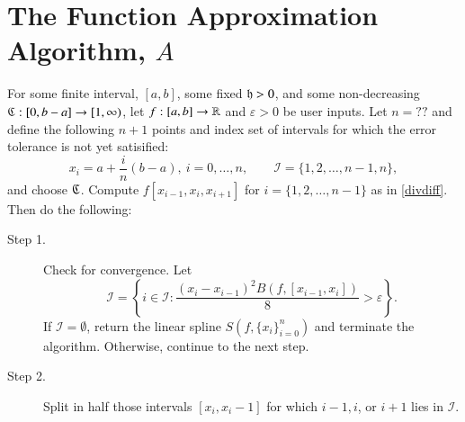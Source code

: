\documentclass[review]{elsarticle}
\begin{document}
\section{The Function Approximation Algorithm, $A$} \label{sec:fappx}

\begin{algo}
For some finite interval, $[a,b]$, some fixed $\mathfrak{h} >0$, and some non-decreasing $\mathfrak{C}:[0,b-a] \to [1, \infty)$, let $f:[a,b] \to \mathbb{R}$ and $\varepsilon >0$ be user inputs.  Let $n = ??$ and define the following $n+1$ points and index set of intervals for which the error tolerance is not yet satisified:
$$x_i=a+\frac{i}{n}(b-a), \ i=0,\ldots,n, \qquad \mathcal{I} = \{1,2,\ldots,n-1,n\},$$ and choose $\mathfrak{C}$. Compute $f[x_{i-1}, x_{i}, x_{i+1}]$ for $i = \{1,2,\ldots,n-1\}$ as in \eqref{divdiff}.   Then do the following:
\begin{description}
\item[Step 1.] \label{stage2} Check for convergence. 
Let 
\[
\mathcal{I} = \left\{i \in \mathcal{I}: \frac{(x_i - x_{i-1})^2B(f,[x_{i-1},x_i])}{8}  > \varepsilon \right\}.
\]
If $\mathcal{I} = \emptyset$, return the linear spline $S(f, \{x_i\}_{i=0}^n)$ and terminate the algorithm.   
Otherwise, continue to the next step.
\item[Step 2.] \label{stage3}  Split in half those intervals $[x_i,x_i-1]$ for which $i-1, i$, or $i+1$ lies in $\mathcal{I}$. %

\end{description}
\end{algo}
\end{document}
